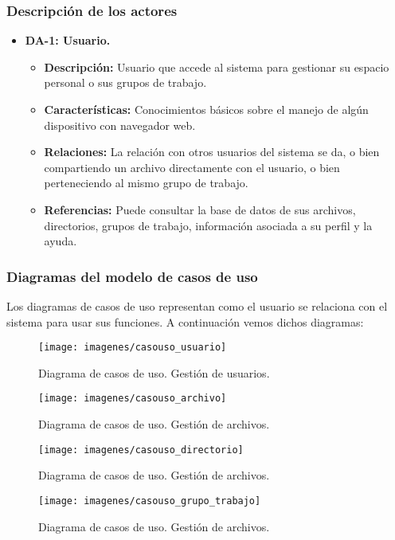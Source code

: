 \subsubsection{Descripción de los actores}
\begin{itemize}
	\item \textbf{DA-1: Usuario.}
	\begin{itemize}
		\item \textbf{Descripción:} Usuario que accede al sistema para gestionar su espacio personal o sus grupos de trabajo.
		\item \textbf{Características:} Conocimientos básicos sobre el manejo de algún dispositivo con navegador web.
		\item \textbf{Relaciones:} La relación con otros usuarios del sistema se da, o bien compartiendo un archivo directamente con el usuario, o bien perteneciendo al mismo grupo de trabajo.
		\item \textbf{Referencias:} Puede consultar la base de datos de sus archivos, directorios, grupos de trabajo, información asociada a su perfil y la ayuda.
	\end{itemize}
\end{itemize}
\subsubsection{Diagramas del modelo de casos de uso}
Los diagramas de casos de uso representan como el usuario se relaciona con el sistema para usar sus funciones. A continuación vemos dichos diagramas:

\begin{figure}[H]
	\centering
	\texttt{[image: imagenes/casouso\_usuario]}
	\caption{Diagrama de casos de uso. Gestión de usuarios.}
	\label{fig:casouso_usuario}
\end{figure}

\begin{figure}[H]
	\centering
	\texttt{[image: imagenes/casouso\_archivo]}
	\caption{Diagrama de casos de uso. Gestión de archivos.}
	\label{fig:casouso_archivo}
\end{figure}

\begin{figure}[H]
	\centering
	\texttt{[image: imagenes/casouso\_directorio]}
	\caption{Diagrama de casos de uso. Gestión de archivos.}
	\label{fig:casouso_directorio}
\end{figure}

\begin{figure}[H]
	\centering
	\texttt{[image: imagenes/casouso\_grupo\_trabajo]}
	\caption{Diagrama de casos de uso. Gestión de archivos.}
	\label{fig:casouso_grupo_trabajo}
\end{figure}

